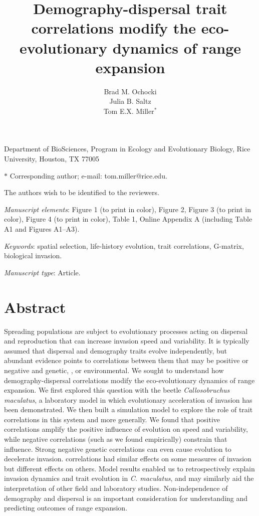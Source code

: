 \documentclass[11pt]{article}
\title{Demography-dispersal trait correlations modify the eco-evolutionary dynamics of range expansion}
\author{Brad M. Ochocki \\
Julia B. Saltz \\
Tom E.X. Miller$^{\ast}$}
\date{}
\newcommand{\revise}[1]{{\color{Mahogany}{#1}}}
\begin{document}
\maketitle

\noindent{} Department of BioSciences, Program in Ecology and Evolutionary Biology, Rice University, Houston, TX 77005

\noindent{} $\ast$ Corresponding author; e-mail: tom.miller@rice.edu.

\bigskip

\noindent{} The authors wish to be identified to the reviewers.

\bigskip

\noindent{} \textit{Manuscript elements}: Figure 1 (to print in color), Figure 2, Figure 3 (to print in color), Figure 4 (to print in color), Table 1, Online Appendix A (including Table A1 and Figures A1--A3).

\bigskip

\noindent{} \textit{Keywords}: spatial selection, life-history evolution, trait correlations, G-matrix, biological invasion.

\bigskip

\noindent{} \textit{Manuscript type}: Article.

\bigskip


\linenumbers{}
\modulolinenumbers[2]

\newpage{}

\section*{Abstract}
Spreading populations are subject to evolutionary processes acting on dispersal and reproduction that can increase invasion speed and variability. It is typically assumed that dispersal and demography traits evolve independently, but abundant evidence points to correlations between them that may be positive or negative and genetic, \revise{maternal}, or  environmental. We sought to understand how demography-dispersal correlations modify the eco-evolutionary dynamics of range expansion. We first explored this question with the beetle \textit{Callosobruchus maculatus}, a laboratory model in which evolutionary acceleration of invasion has been demonstrated. We then built a simulation model to explore the role of trait correlations in this system and more generally. We found that positive correlations amplify the positive influence of evolution on speed and variability, while negative correlations (such as we found empirically) constrain that influence. Strong negative genetic correlations can even cause evolution to decelerate invasion. \revise{Genetic and non-genetic (maternal and environmental)} correlations had similar effects on some measures of invasion but different effects on others. Model results enabled us to retrospectively explain invasion dynamics and trait evolution in \textit{C. maculatus}, and may similarly aid the interpretation of other field and laboratory studies. Non-independence of demography and dispersal is an important consideration for understanding and predicting outcomes of range expansion.
\end{document}
